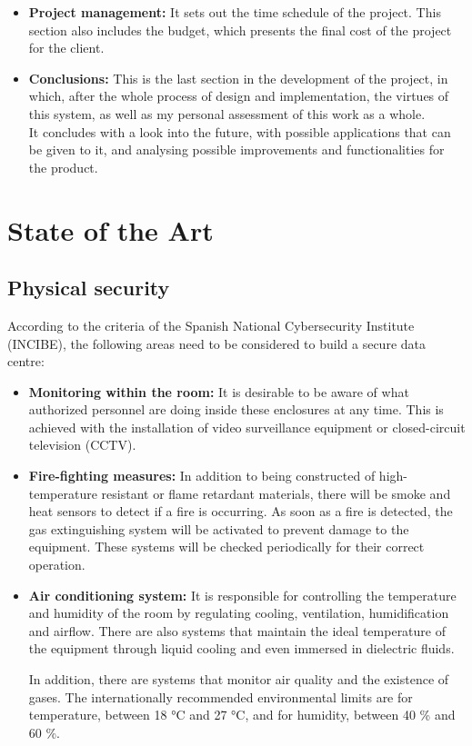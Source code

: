 \begin{itemize}
	\item \textbf{Project management:} It sets out the time schedule of the project. This section also includes the budget, which presents the final cost of the project for the client.
	\item \textbf{Conclusions:} This is the last section in the development of the project, in which, after the whole process of design and implementation, the virtues of this system, as well as my personal assessment of this work as a whole. \\ It concludes with a look into the future, with possible applications that can be given to it, and analysing possible improvements and functionalities for the product.
\end{itemize}
\pagebreak

\section{State of the Art}\label{sec:state-of-the-art}
\subsection{Physical security}\label{subsec:physical-security}
According to the criteria of the Spanish National Cybersecurity Institute (INCIBE), the following areas need to be considered to build a secure data centre:
\begin{itemize}
	\item \textbf{Monitoring within the room:} It is desirable to be aware of what authorized personnel are doing inside these enclosures at any time. This is achieved with the installation of video surveillance equipment or closed-circuit television (CCTV).
	\item \textbf{Fire-fighting measures:} In addition to being constructed of high-temperature resistant or flame retardant materials, there will be smoke and heat sensors to detect if a fire is occurring. As soon as a fire is detected, the gas extinguishing system will be activated to prevent damage to the equipment. These systems will be checked periodically for their correct operation.
	\item \textbf{Air conditioning system:} It is responsible for controlling the temperature and humidity of the room by regulating cooling, ventilation, humidification and airflow. There are also systems that maintain the ideal temperature of the equipment through liquid cooling and even immersed in dielectric fluids.

	In addition, there are systems that monitor air quality and the existence of gases. The internationally recommended environmental limits are for temperature, between 18 °C and 27 °C, and for humidity, between 40 \% and 60 \%.
\end{itemize}

